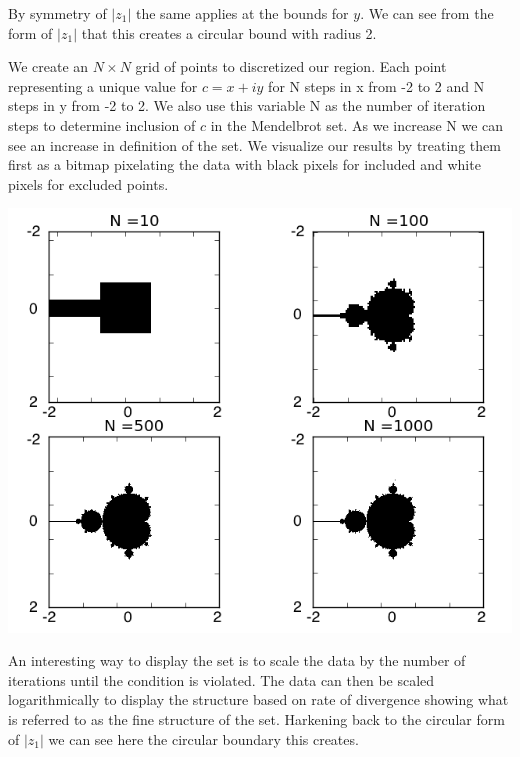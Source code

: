 \documentclass[12pt]{article}
\begin{document}
By symmetry of $|z_1|$ the same applies at the bounds for $y$.  We can see from the form of $|z_1|$ that this creates a circular bound with radius 2.

We create an $N\times N$ grid of points to discretized our region.  Each point representing a unique value for $c = x + iy$ for N steps in x from -2 to 2 and N steps in y from -2 to 2.  We also use this variable N as the number of iteration steps to determine inclusion of $c$ in the Mendelbrot set.  As we increase N we can see an increase in definition of the set.  We visualize our results by treating them first as a bitmap pixelating the data with black pixels for included and white pixels for excluded points.

\includegraphics{rv_bw_fourplot.png}

An interesting way to display the set is to scale the data by the number of iterations until the condition is violated.  The data can then be scaled logarithmically to display the structure based on rate of divergence showing what is referred to as the fine structure of the set.  Harkening back to the circular form of $|z_1|$ we can see here the circular boundary this creates.
\end{document}
